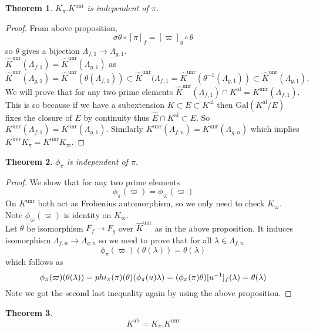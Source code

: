 \documentclass[twoside, 12pt]{iiser-thesis}
\newtheorem{thm}{{Theorem}}[section]
\newcommand{\gal}{\text{Gal}}
\newcommand{\un}{\text{unr}}
\newcommand{\al}{\text{al}}
\newcommand{\ab}{\text{ab}}
\begin{document}
\begin{thm}
$K_\pi . K^\un$ is independent of $\pi$.
\end{thm}
\begin{proof}From above proposition,
\[\sigma \theta \circ [\pi]_f=[\varpi ]_g \circ \theta \] so $\theta$ gives a bijection $ \Lambda _{f,1} \rightarrow \Lambda _{g,1}$. \\
$\hat K ^\un (\Lambda _{f,1})= \hat K ^\un (\Lambda _{g,1})$ as \[ \hat K ^\un (\Lambda _{g,1})= \hat K ^\un (\theta (\Lambda _{f,1})) \subset \hat K ^\un (\Lambda _{f,1} = \hat K ^\un (\theta ^{-1} (\Lambda _{g,1})) \subset \hat K ^\un (\Lambda _{g,1}).\]
We will prove that for any two prime elements $\hat K^ \un (\Lambda _{f,1}) \cap K^ \al = K^ \un (\Lambda _{f,1}) $. This is so because if we have a subextension $K\subset E \subset K^\al$ then $\gal (K^\al/E)$ fixes the closure of $E$ by continuity thus $ \hat E \cap K^\al \subset E$. So $K ^\un (\Lambda _{f,1}) = K ^\un (\Lambda _{g,1})$. Similarly $K ^\un (\Lambda _{f,n})= K^\un (\Lambda _{g,n})$ which implies $K^ \un K _\pi= K^ \un K_\varpi$.
\end{proof}
\begin{thm}
$\phi_\pi$ is independent of $\pi$.
\end{thm}
\begin{proof}
We show that for any two prime elements \[\phi _\pi(\varpi )=\phi _\varpi (\varpi )\]
On $K ^\un$ both act as Frobenius automorphism, so we only need to check $K_\varpi$. \\
Note $\phi _\varpi (\varpi)$ is identity on $K_\varpi$. \\
Let $\theta$ be isomorphism $F_f \rightarrow F_g$ over $\hat K ^\un$ as in the above proposition. It induces isomorphism $ \Lambda _{f,n} \rightarrow \Lambda _{g,n}$ so we need to prove that for all $\lambda \in \Lambda _{f,n}$ \[ \phi _\pi (\varpi ) (\theta (\lambda )) = \theta (\lambda )\]
which follows as \[ \phi _\pi (\varpi )(\theta (\lambda ))= \\phi _\pi (\pi ) (\theta)(\phi _\pi (u) \lambda )=(\phi_\pi (\pi) \theta )[u^{-1}]_f (\lambda)=\theta (\lambda) \] Note we got the second last inequality again by using the above proposition.
\end{proof}
\begin{thm}
\[K^\ab =K _\pi . K^\un \]
\end{thm}
\end{document}
